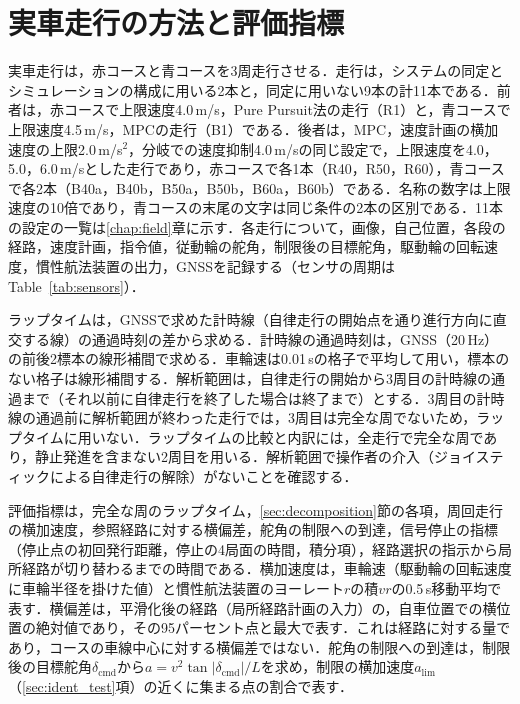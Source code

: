 \section{実車走行の方法と評価指標}
\label{sec:field_method}
実車走行は，赤コースと青コースを3周走行させる．走行は，システムの同定とシミュレーションの構成に用いる2本と，同定に用いない9本の計11本である．前者は，赤コースで上限速度4.0\,m/s，Pure Pursuit法の走行（R1）と，青コースで上限速度4.5\,m/s，MPCの走行（B1）である．後者は，MPC，速度計画の横加速度の上限2.0\,m/s$^2$，分岐での速度抑制4.0\,m/sの同じ設定で，上限速度を4.0，5.0，6.0\,m/sとした走行であり，赤コースで各1本（R40，R50，R60），青コースで各2本（B40a，B40b，B50a，B50b，B60a，B60b）である．名称の数字は上限速度の10倍であり，青コースの末尾の文字は同じ条件の2本の区別である．11本の設定の一覧は\ref{chap:field}章に示す．各走行について，画像，自己位置，各段の経路，速度計画，指令値，従動輪の舵角，制限後の目標舵角，駆動輪の回転速度，慣性航法装置の出力，GNSSを記録する（センサの周期はTable~\ref{tab:sensors}）．

ラップタイムは，GNSSで求めた計時線（自律走行の開始点を通り進行方向に直交する線）の通過時刻の差から求める．計時線の通過時刻は，GNSS（20\,Hz）の前後2標本の線形補間で求める．車輪速は0.01\,sの格子で平均して用い，標本のない格子は線形補間する．解析範囲は，自律走行の開始から3周目の計時線の通過まで（それ以前に自律走行を終了した場合は終了まで）とする．3周目の計時線の通過前に解析範囲が終わった走行では，3周目は完全な周でないため，ラップタイムに用いない．ラップタイムの比較と内訳には，全走行で完全な周であり，静止発進を含まない2周目を用いる．解析範囲で操作者の介入（ジョイスティックによる自律走行の解除）がないことを確認する．

評価指標は，完全な周のラップタイム，\ref{sec:decomposition}節の各項，周回走行の横加速度，参照経路に対する横偏差，舵角の制限への到達，信号停止の指標（停止点の初回発行距離，停止の4局面の時間，積分項），経路選択の指示から局所経路が切り替わるまでの時間である．横加速度は，車輪速（駆動輪の回転速度に車輪半径を掛けた値）と慣性航法装置のヨーレート$r$の積$vr$の0.5\,s移動平均で表す．横偏差は，平滑化後の経路（局所経路計画の入力）の，自車位置での横位置の絶対値であり，その95パーセント点と最大で表す．これは経路に対する量であり，コースの車線中心に対する横偏差ではない．舵角の制限への到達は，制限後の目標舵角$\delta_{\mathrm{cmd}}$から$a=v^2\tan|\delta_{\mathrm{cmd}}|/L$を求め，制限の横加速度$a_{\mathrm{lim}}$（\ref{sec:ident_test}項）の近くに集まる点の割合で表す．
